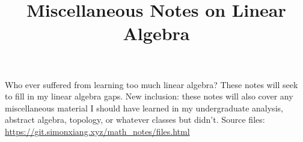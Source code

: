 \documentclass[fontsize=9pt]{article}
\title{Miscellaneous Notes on Linear Algebra}
\begin{document}
\maketitle
Who ever suffered from learning too much linear algebra? These notes will seek to fill in my linear algebra gaps. New inclusion: these notes will also cover any miscellaneous material I should have learned in my undergraduate analysis, abstract algebra, topology, or whatever classes but didn't. Source files: \url{https://git.simonxiang.xyz/math_notes/files.html}
\tableofcontents
\newpage
    
    
\end{document}
